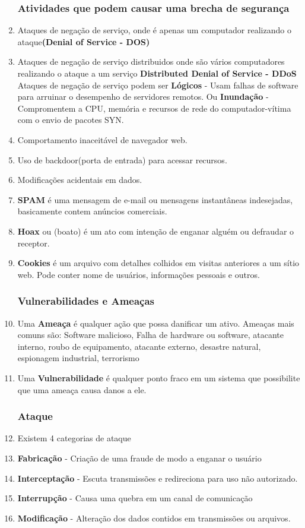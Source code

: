 \documentclass{report}
\begin{document}
\begin{enumerate}[label=--]
		\subsubsection{Atividades que podem causar uma brecha de segurança}
		\item Ataques de negação de serviço, onde é apenas um computador realizando o ataque\textbf{(Denial of Service - DOS)}
		\item Ataques de negação de serviço distribuidos onde são vários computadores realizando o ataque a um serviço \textbf{Distributed Denial of Service - DDoS}
		\subitem Ataques de negação de serviço podem ser \textbf{Lógicos}  - Usam falhas de software para arruinar o desempenho de servidores remotos. Ou \textbf{Inundação} - Compromentem a CPU, memória e recursos de rede do computador-vítima com o envio de pacotes SYN.
		\item Comportamento inaceitável de navegador web.
		\item Uso de backdoor(porta de entrada) para acessar recursos.
		\item Modificações acidentais em dados.
		\item \textbf{SPAM} é uma mensagem de e-mail ou mensagens instantâneas indesejadas, basicamente contem anúncios comerciais.
		\item \textbf{Hoax} ou (boato) é um ato com intenção de enganar alguém ou defraudar o receptor.
		\item \textbf{Cookies} é um arquivo com detalhes colhidos em visitas anteriores a um sítio web. Pode conter nome de usuários, informações pessoais e outros.
		
		\subsubsection{Vulnerabilidades e Ameaças}
		\item Uma \textbf{Ameaça} é qualquer ação que possa danificar um ativo.
		\subsubitem Ameaças mais comuns são: Software malicioso, Falha de hardware ou software, atacante interno, roubo de equipamento, atacante externo, desastre natural, espionagem industrial, terrorismo 
		\item Uma \textbf{Vulnerabilidade} é qualquer ponto fraco em um sistema que possibilite que uma ameaça causa danos a ele.
		
		\subsubsection{Ataque}
		\item Existem 4 categorias de ataque
		\item \textbf{Fabricação} - Criação de uma fraude de modo a enganar o usuário
		\item \textbf{Interceptação} - Escuta transmissões e redireciona para uso não autorizado.
		\item \textbf{Interrupção} - Causa uma quebra em um canal de comunicação
		\item \textbf{Modificação} - Alteração dos dados contidos em transmissões ou arquivos.
		
	
	\end{enumerate}
	
\end{document}
